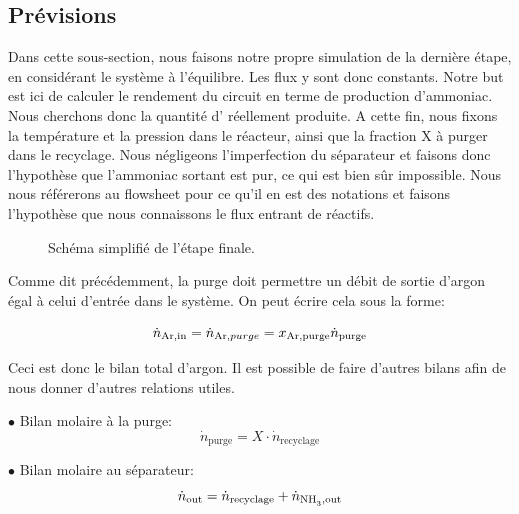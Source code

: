 \subsection{Prévisions}

Dans cette sous-section, nous faisons notre propre simulation de la dernière étape, en considérant
le système à l'équilibre. Les flux y sont donc constants. Notre but est ici de calculer 
le rendement du circuit en terme de production d'ammoniac. 
Nous cherchons donc la quantité d' réellement produite.
A cette fin, nous fixons la température et la pression dans le réacteur, ainsi que la fraction X
à purger dans le recyclage.
Nous négligeons l'imperfection du séparateur et faisons donc l'hypothèse 
que l'ammoniac sortant est pur, ce qui est bien s\^ur impossible.
Nous nous référerons au flowsheet pour ce qu'il en est des notations et
faisons l'hypothèse que nous connaissons le flux entrant de réactifs.

\begin{figure}[h!]
	\begin{center}
		
	\end{center}
	\caption{Schéma simplifié de l'étape finale.}
	\label{fig:flow_synthese}
\end{figure}

Comme dit précédemment, la purge doit permettre un débit 
de sortie d'argon égal à celui d'entrée dans le système. 
On peut écrire cela sous la forme:

\begin{equation}
\dot{n}_{\ce{Ar},\text{in}}=\dot{n}_{\ce{Ar},purge}=x_{\ce{Ar},\text{purge}} \dot{n}_{\text{purge}}
\label{eq:bilan_tot_argon}
\end{equation}

Ceci est donc le bilan total d'argon. 
Il est possible de faire d'autres bilans afin de nous donner d'autres relations utiles.

$\bullet$ Bilan molaire à la purge:
\begin{equation}
\dot{n}_{\text{purge}} = X \cdot \dot{n}_{\text{recyclage}}
\label{eq:bilan_mol_purge}
\end{equation}

$\bullet$ Bilan molaire au séparateur:
\begin{equation}
\dot{n}_{\text{out}}=\dot{n}_{\text{recyclage}}+\dot{n}_{\ce{NH3},\text{out}}
\label{eq:bilan_mol_sep}
\end{equation}


